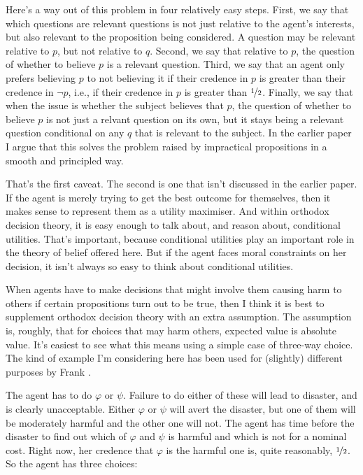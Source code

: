 Here's a way out of this problem in four relatively easy steps. First, we say that which questions are relevant questions is not just relative to the agent's interests, but also relevant to the proposition being considered. A question may be relevant relative to \(p\), but not relative to \(q\). Second, we say that relative to \(p\), the question of whether to believe \(p\) is a relevant question. Third, we say that an agent only prefers believing \(p\) to not believing it if their credence in \(p\) is greater than their credence in \(\neg p\), i.e., if their credence in \(p\) is greater than \(\nicefrac{1}{2}\). Finally, we say that when the issue is whether the subject believes that \(p\), the question of whether to believe \(p\) is not just a relvant question on its own, but it stays being a relevant question conditional on any \(q\) that is relevant to the subject. In the earlier paper \citep{Weatherson2005-WEACWD} I argue that this solves the problem raised by impractical propositions in a smooth and principled way.

That's the first caveat. The second is one that isn't discussed in the earlier paper. If the agent is merely trying to get the best outcome for themselves, then it makes sense to represent them as a utility maximiser. And within orthodox decision theory, it is easy enough to talk about, and reason about, conditional utilities. That's important, because conditional utilities play an important role in the theory of belief offered here. But if the agent faces moral constraints on her decision, it isn't always so easy to think about conditional utilities.

When agents have to make decisions that might involve them causing harm to others if certain propositions turn out to be true, then I think it is best to supplement orthodox decision theory with an extra assumption. The assumption is, roughly, that for choices that may harm others, expected value is absolute value. It's easiest to see what this means using a simple case of three-way choice. The kind of example I'm considering here has been used for (slightly) different purposes by Frank \cite{Jackson1991}. 

The agent has to do \(\varphi\) or \(\psi\). Failure to do either of these will lead to disaster, and is clearly unacceptable. Either \(\varphi\) or \(\psi\) will avert the disaster, but one of them will be moderately harmful and the other one will not. The agent has time before the disaster to find out which of \(\varphi\) and \(\psi\) is harmful and which is not for a nominal cost. Right now, her credence that \(\varphi\) is the harmful one is, quite reasonably, \(\nicefrac{1}{2}\). So the agent has three choices:

